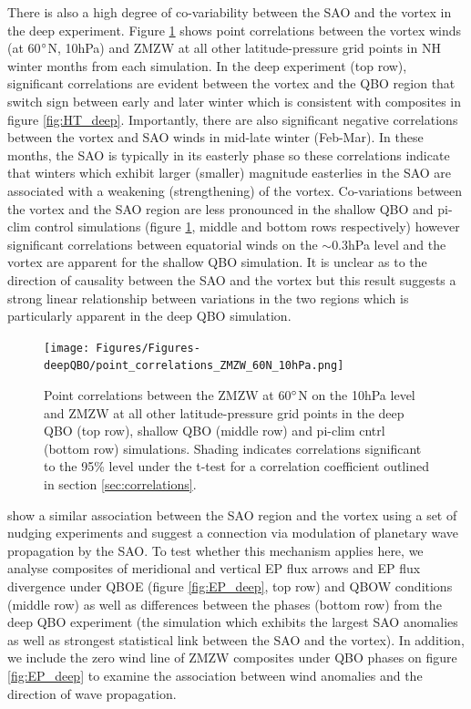 There is also a high degree of co-variability between the SAO and the vortex in the deep experiment. Figure \ref{fig:point_cors} shows point correlations between the vortex winds (at 60$\degree$N, 10hPa) and ZMZW at all other latitude-pressure grid points in NH winter months from each simulation. In the deep experiment (top row), significant correlations are evident between the vortex and the QBO region that switch sign between early and later winter which is consistent with composites in figure \ref{fig:HT_deep}. Importantly, there are also significant negative correlations between the vortex and SAO winds in mid-late winter (Feb-Mar). In these months, the SAO is typically in its easterly phase so these correlations indicate that winters which exhibit larger (smaller) magnitude easterlies in the SAO are associated with a weakening (strengthening) of the vortex. Co-variations between the vortex and the SAO region are less pronounced in the shallow QBO and pi-clim control simulations (figure \ref{fig:point_cors}, middle and bottom rows respectively) however significant correlations between equatorial winds on the $\sim$0.3hPa level and the vortex are apparent for the shallow QBO simulation. It is unclear as to the direction of causality between
the SAO and the vortex but this result suggests a strong linear relationship between variations in the two regions which is particularly apparent in the deep QBO simulation.

\begin{figure}[h!]
\begin{center}
\noindent\texttt{[image: Figures/Figures-deepQBO/point\_correlations\_ZMZW\_60N\_10hPa.png]}
\caption[Point correlations between vortex ZMZWs and winds at other points in QBO experiments]{Point correlations between the ZMZW at 60$\degree$N on the 10hPa level and ZMZW at all other latitude-pressure grid points in the deep QBO (top row), shallow QBO (middle row) and pi-clim cntrl (bottom row) simulations. Shading indicates correlations significant to the 95\% level under the t-test for a correlation coefficient outlined in section \ref{sec:correlations}.}
\label{fig:point_cors}
\end{center}
\end{figure}

\cite{grayForecasting2020a} show a similar association between the SAO region and the vortex using a set of nudging experiments and suggest a connection via modulation of planetary wave propagation by the SAO. To test whether this mechanism applies here, we analyse composites of meridional and vertical EP flux arrows and EP flux divergence under QBOE (figure \ref{fig:EP_deep}, top row) and QBOW conditions (middle row) as well as differences between the phases (bottom row) from the deep QBO experiment (the simulation which exhibits the largest SAO anomalies as well as strongest statistical link between the SAO and the vortex). In addition, we include the zero wind line of ZMZW composites under QBO phases on figure \ref{fig:EP_deep} to examine the association between wind anomalies and the direction of wave propagation. 

